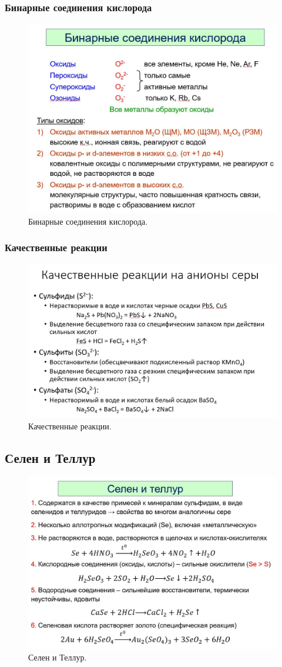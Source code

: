 \subsubsection{Бинарные соединения кислорода}
\begin{figure}[H]
	\centering
	\includegraphics[width=0.7\linewidth]{Pictures/Bin.jpg}
	\caption{Бинарные соединения кислорода.}
\end{figure}

\subsubsection{Качественные реакции}
\begin{figure}[H]
	\centering
	\includegraphics[width=0.7\linewidth]{Pictures/Kach.jpg}
	\caption{Качественные реакции.}
\end{figure}

\subsection{Селен и Теллур}
\begin{figure}[H]
	\centering
	\includegraphics[width=0.7\linewidth]{Pictures/Se.jpg}
	\caption{Селен и Теллур.}
\end{figure}
